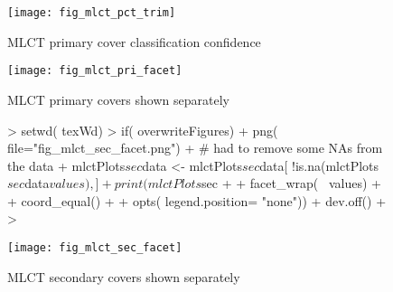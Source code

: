 \begin{figure} 
\begin{center}
  
\begin{Schunk}
\end{Schunk}

\texttt{[image: fig\_mlct\_pct\_trim]}
\end{center} 
\caption{MLCT primary cover classification confidence} 
\label{fig:mlct_pct} 
\end{figure} 



\begin{figure} 
\begin{center}
  
\begin{Schunk}
\end{Schunk}

\texttt{[image: fig\_mlct\_pri\_facet]}
\end{center} 
\caption{MLCT primary covers shown separately} 
\label{fig:mlct_pri_reclass} 
\end{figure} 


\begin{figure} 
\begin{center}
  
\begin{Schunk}
\begin{Sinput}
> setwd( texWd)
> if( overwriteFigures) {
+   png( file="fig_mlct_sec_facet.png")
+                                         # had to remove some NAs from the data
+   mlctPlots$sec$data <- mlctPlots$sec$data[ !is.na(mlctPlots$sec$data$values),]
+   print( mlctPlots$sec + 
+         facet_wrap(~ values) + 
+         coord_equal() +
+         opts( legend.position= "none"))
+   dev.off()
+ }
> 
\end{Sinput}
\end{Schunk}

\texttt{[image: fig\_mlct\_sec\_facet]}
\end{center} 
\caption{MLCT secondary covers shown separately} 
\label{fig:mlct_pri_reclass} 
\end{figure} 


